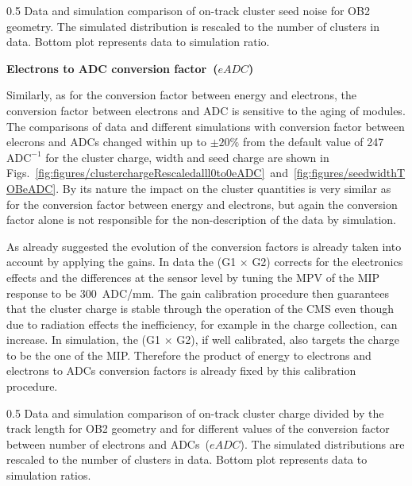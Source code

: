                  {0.5}       %
                 { Data and simulation comparison of on-track cluster seed noise for OB2 geometry. The simulated distribution is rescaled to the number of clusters in data.  Bottom plot represents data to simulation ratio. }


\textbf{Electrons to ADC conversion factor~($eADC$)}

Similarly, as for the conversion factor between energy and electrons, the conversion factor between electrons and ADC is sensitive to the aging of modules. The comparisons of data and different simulations with conversion factor between elecrons and ADCs changed within up to $\pm 20\%$ from the default value of 247~$\mathrm{ADC^{-1}}$ for the cluster charge, width and seed charge are shown in Figs.~\ref{fig:figures/clusterchargeRescaledalll0to0eADC}~and~\ref{fig:figures/seedwidthTOBeADC}. By its nature the impact on the cluster quantities is very similar as for the conversion factor between energy and electrons, but again the conversion factor alone is not responsible for the non-description of the data by simulation. 

As already suggested the evolution of the conversion factors is already taken into account by applying the gains. In data the (G1 $\times$ G2) corrects for the electronics effects and the differences at the sensor level by tuning the MPV of the MIP response to be 300~ADC/mm. The gain calibration procedure then guarantees that the cluster charge is stable through the operation of the CMS even though due to radiation effects the inefficiency, for example in the charge collection, can increase. In simulation, the (G1 $\times$ G2), if well calibrated, also targets the charge to be the one of the MIP. Therefore the product of energy to electrons and electrons to ADCs conversion factors is already fixed by this calibration procedure. 


                 {0.5}       %
                 { Data and simulation comparison of on-track cluster charge divided by the track length for OB2 geometry and for different values of the conversion factor between number of electrons and ADCs~($eADC$). The simulated distributions are rescaled to the number of clusters in data.  Bottom plot represents data to simulation ratios. }

